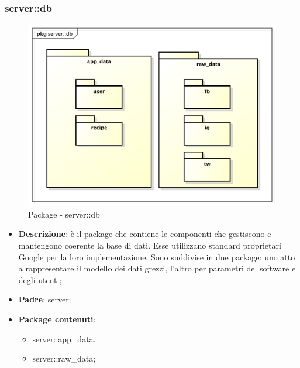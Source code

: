 

\subsubsection{server::db} %
\label{ssub:bdsm_app_server_db}
	\begin{figure}[htbp]
		\centering
		\centerline{\includegraphics[scale=0.5]{./images/server/db.pdf}}
		\caption{Package - server::db}
	\end{figure}
	\begin{itemize}
		\item \textbf{Descrizione}: è il package che contiene le componenti che gestiscono e mantengono coerente la base di dati. Esse utilizzano standard proprietari Google per la loro implementazione. Sono suddivise in due package: uno atto a rappresentare il modello dei dati grezzi, l'altro per parametri del software e degli utenti;
		\item \textbf{Padre}: server;
		\item \textbf{Package contenuti}:
			\begin{itemize}
				\item server::app\_data.
				\item server::raw\_data;
			\end{itemize}
	\end{itemize}

